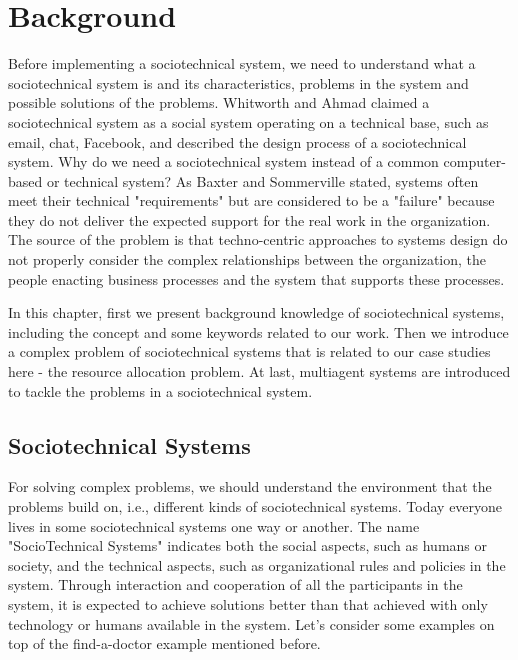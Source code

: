 \chapter{Background}
\label{ch1}

Before implementing a sociotechnical system, we need to understand what a sociotechnical system is and its characteristics, problems in the system and possible solutions of the problems. Whitworth and Ahmad \cite{whitworth2013} claimed a sociotechnical system as a social system operating on a technical base, such as email, chat, Facebook, and described the design process of a sociotechnical system. Why do we need a sociotechnical system instead of a common computer-based or technical system? As Baxter and Sommerville \cite{baxter2011} stated, systems often meet their technical "requirements" but are considered to be a "failure" because they do not deliver the expected support for the real work in the organization. The source of the problem is that techno-centric approaches to systems design do not properly consider the complex relationships between the organization, the people enacting business processes and the system that supports these processes.

In this chapter, first we present background knowledge of sociotechnical systems, including the concept and some keywords related to our work. Then we introduce a complex problem of sociotechnical systems that is related to our case studies here - the resource allocation problem. At last, multiagent systems are introduced to tackle the problems in a sociotechnical system.  

\section{Sociotechnical Systems}
\label{ch1:sociotechnicalSys}
For solving complex problems, we should understand the environment that the problems build on, i.e., different kinds of sociotechnical systems. Today everyone lives in some sociotechnical systems one way or another. The name "SocioTechnical Systems" indicates both the social aspects, such as humans or society, and the technical aspects, such as organizational rules and policies in the system. Through interaction and cooperation of all the participants in the system, it is expected to achieve solutions better than that achieved with only technology or humans available in the system. Let's consider some examples on top of the find-a-doctor example mentioned before. 

